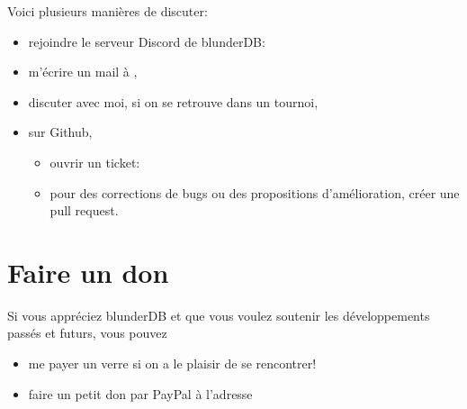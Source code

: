 \documentclass[letterpaper,10pt,french]{sphinxmanual}
\begin{document}
\sphinxAtStartPar
Voici plusieurs manières de discuter:
\begin{itemize}
\item {} 
\sphinxAtStartPar
rejoindre le serveur Discord de blunderDB: 

\item {} 
\sphinxAtStartPar
m’écrire un mail à ,

\item {} 
\sphinxAtStartPar
discuter avec moi, si on se retrouve dans un tournoi,

\item {} 
\sphinxAtStartPar
sur Github,
\begin{itemize}
\item {} 
\sphinxAtStartPar
ouvrir un ticket: 

\item {} 
\sphinxAtStartPar
pour des corrections de bugs ou des propositions d’amélioration,
créer une pull request.

\end{itemize}

\end{itemize}


\chapter{Faire un don}
\label{\detokenize{index:faire-un-don}}
\sphinxAtStartPar
Si vous appréciez blunderDB et que vous voulez soutenir les développements passés et futurs, vous pouvez
\begin{itemize}
\item {} 
\sphinxAtStartPar
me payer un verre si on a le plaisir de se rencontrer!

\item {} 
\sphinxAtStartPar
faire un petit don par PayPal à l’adresse 

\end{itemize}
\end{document}
